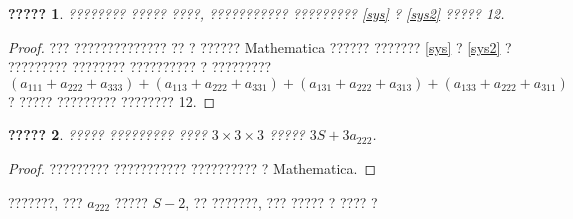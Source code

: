 \documentclass[12pt, a4paper]{article}
\newtheorem{lemma}{?????}%
\begin{document}
\begin{lemma}\label{main}
???????? ????? ????, ??????????? ????????? \eqref{sys} ? \eqref{sys2} ????? 12.
\end{lemma}

\begin{proof} ??? ?????????????? ?? ? ?????? Mathematica ?????? ??????? \eqref{sys} ? \eqref{sys2} ? ????????? ???????? ?????????? ? ????????? $$(a_{111} + a_{222} + a_{333}) + (a_{113} + a_{222} + a_{331}) + (a_{131} + a_{222} + a_{313}) + (a_{133} + a_{222} + a_{311})$$ ? ????? ????????? ???????? 12.

\vspace{12pt}

\end{proof}
\newpage
\begin{lemma}\label{other} ????? ????????? ???? $3\times3\times3$ ????? $3S+3a_{222}$.
\end{lemma}

\begin{proof} ????????? ??????????? ?????????? ? Mathematica.

\end{proof}

???????, ??? $a_{222}$ ????? $S-2$, ?? ???????, ??? ????? ? ???? ?
\end{document}
